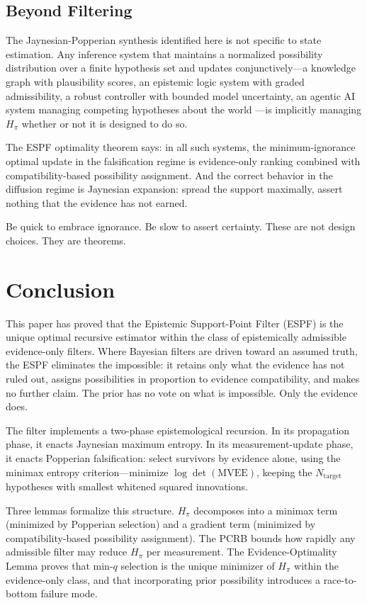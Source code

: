 \documentclass[12pt]{article}
\begin{document}
\subsection{Beyond Filtering}

The Jaynesian-Popperian synthesis identified here is not specific to state estimation. Any inference system that maintains a normalized possibility distribution over a finite hypothesis set and updates conjunctively---a knowledge graph with plausibility scores, an epistemic logic system with graded admissibility, a robust controller with bounded model uncertainty, an agentic AI system managing competing hypotheses about the world \cite{gaiagraph}---is implicitly managing $H_\pi$ whether or not it is designed to do so.

The ESPF optimality theorem says: in all such systems, the minimum-ignorance optimal update in the falsification regime is evidence-only ranking combined with compatibility-based possibility assignment. And the correct behavior in the diffusion regime is Jaynesian expansion: spread the support maximally, assert nothing that the evidence has not earned.

Be quick to embrace ignorance. Be slow to assert certainty. These are not design choices. They are theorems.

\section{Conclusion}

This paper has proved that the Epistemic Support-Point Filter (ESPF) is the unique optimal
recursive estimator within the class of epistemically admissible evidence-only filters.
Where Bayesian filters are driven toward an assumed truth, the ESPF eliminates the impossible:
it retains only what the evidence has not ruled out, assigns possibilities in proportion to
evidence compatibility, and makes no further claim. The prior has no vote on what is impossible.
Only the evidence does.

The filter implements a two-phase epistemological recursion. In its propagation phase, it enacts Jaynesian maximum entropy. In its measurement-update phase, it enacts Popperian falsification: select survivors by evidence alone, using the minimax entropy criterion---minimize $\log\det(\mathrm{MVEE})$, keeping the $N_{\mathrm{target}}$ hypotheses with smallest whitened squared innovations.

Three lemmas formalize this structure. $H_\pi$ decomposes into a minimax term (minimized by Popperian selection) and a gradient term (minimized by compatibility-based possibility assignment). The PCRB bounds how rapidly any admissible filter may reduce $H_\pi$ per measurement. The Evidence-Optimality Lemma proves that min-$q$ selection is the unique minimizer of $H_\pi$ within the evidence-only class, and that incorporating prior possibility introduces a race-to-bottom failure mode.
\end{document}
